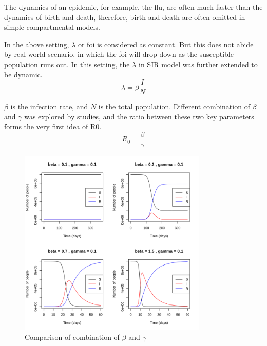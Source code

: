 \documentclass[a4paper, 12pt, twoside]{article}
\begin{document}
The dynamics of an epidemic, for example, the flu, are often much faster than the dynamics of birth and death, therefore, birth and death are often omitted in simple compartmental models.

In the above setting, $\lambda$ or  \gls{foi} is considered as constant. But this does not abide by real world scenario, in which the \gls{foi} will drop down as the susceptible population runs out.
In this setting, the $\lambda$ in SIR model was further extended to be dynamic.
\begin{equation}
	\lambda = \beta \frac{I}{N}
\end{equation}

$\beta$ is the infection rate, and $N$ is the total population.
Different combination of $\beta$ and $\gamma$ was explored by studies, and the ratio between these two key parameters forms the very first idea of \gls{R0}.
\begin{equation}
	R_0 = \frac{\beta}{\gamma}
\end{equation}
\begin{figure}[htpb]
	\centering
	\includegraphics[width=0.8\textwidth]{sir-model-beta-gamma}
	\caption{Comparison of combination of $\beta$ and $\gamma$}
	\label{fig:sir-model-beta-gamma}
\end{figure}
\end{document}

